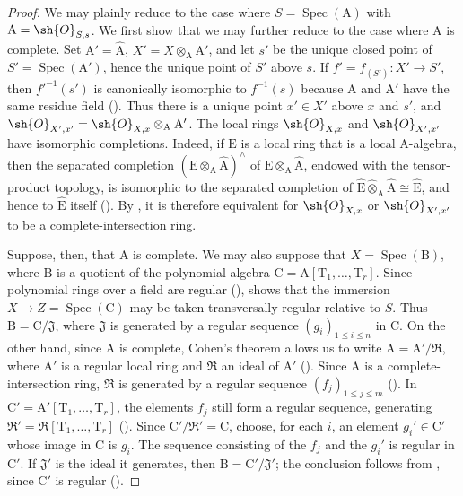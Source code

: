 \begin{proof}
We may plainly reduce to the case where $S=\operatorname{Spec}(\mathrm{A})$ with $\mathrm{A}=\sh{O}_{S,s}$. We first show that we may further reduce to the case where $\mathrm{A}$ is complete.
Set $\mathrm{A}'=\widehat{\mathrm{A}}$, $X'=X\otimes_{\mathrm{A}}\mathrm{A}'$, and let $s'$ be the unique closed point of $S'=\operatorname{Spec}(\mathrm{A}')$, hence the unique point of $S'$ above $s$. If $f'=f_{(S')}:X'\to S'$, then $f'^{-1}(s')$ is canonically isomorphic to $f^{-1}(s)$ because $\mathrm{A}$ and $\mathrm{A}'$ have the same residue field (). Thus there is a unique point $x'\in X'$ above $x$ and $s'$, and $\sh{O}_{X',x'}=\sh{O}_{X,x}\otimes_{\mathrm{A}}\mathrm{A}'$.
The local rings $\sh{O}_{X,x}$ and $\sh{O}_{X',x'}$ have isomorphic completions. Indeed, if $\mathrm{E}$ is a local ring that is a local $\mathrm{A}$-algebra, then the separated completion $(\mathrm{E}\otimes_{\mathrm{A}}\widehat{\mathrm{A}})^\wedge$ of $\mathrm{E}\otimes_{\mathrm{A}}\widehat{\mathrm{A}}$, endowed with the tensor-product topology, is isomorphic to the separated completion of $\widehat{\mathrm{E}}\widehat{\otimes}_{\mathrm{A}}\widehat{\mathrm{A}}\cong\widehat{\mathrm{E}}$, and hence to $\widehat{\mathrm{E}}$ itself (). By , it is therefore equivalent for $\sh{O}_{X,x}$ or $\sh{O}_{X',x'}$ to be a complete-intersection ring.

Suppose, then, that $\mathrm{A}$ is complete. We may also suppose that $X=\operatorname{Spec}(\mathrm{B})$, where $\mathrm{B}$ is a quotient of the polynomial algebra $\mathrm{C}=\mathrm{A}[\mathrm{T}_1,\ldots,\mathrm{T}_r]$. Since polynomial rings over a field are regular (),  shows that the immersion $X\to Z=\operatorname{Spec}(\mathrm{C})$ may be taken transversally regular relative to $S$. Thus $\mathrm{B}=\mathrm{C}/\mathfrak{J}$, where $\mathfrak{J}$ is generated by a regular sequence $(g_i)_{1\leq i\leq n}$ in $\mathrm{C}$.
On the other hand, since $\mathrm{A}$ is complete, Cohen's theorem allows us to write $\mathrm{A}=\mathrm{A}'/\mathfrak{R}$, where $\mathrm{A}'$ is a regular local ring and $\mathfrak{R}$ an ideal of $\mathrm{A}'$ (). Since $\mathrm{A}$ is a complete-intersection ring, $\mathfrak{R}$ is generated by a regular sequence $(f_j)_{1\leq j\leq m}$ ().
In $\mathrm{C}'=\mathrm{A}'[\mathrm{T}_1,\ldots,\mathrm{T}_r]$, the elements $f_j$ still form a regular sequence, generating $\mathfrak{R}'=\mathfrak{R}[\mathrm{T}_1,\ldots,\mathrm{T}_r]$ (). Since $\mathrm{C}'/\mathfrak{R}'=\mathrm{C}$, choose, for each $i$, an element $g_i'\in\mathrm{C}'$ whose image in $\mathrm{C}$ is $g_i$. The sequence consisting of the $f_j$ and the $g_i'$ is regular in $\mathrm{C}'$. If $\mathfrak{J}'$ is the ideal it generates, then $\mathrm{B}=\mathrm{C}'/\mathfrak{J}'$; the conclusion follows from , since $\mathrm{C}'$ is regular ().
\end{proof}

